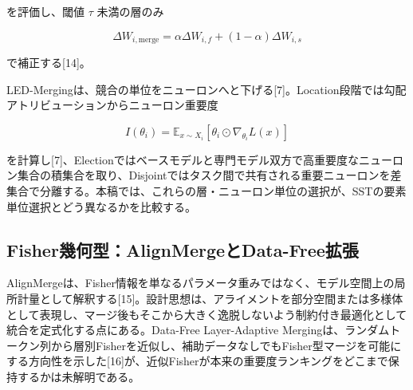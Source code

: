 \documentclass{article}
\begin{document}
を評価し、閾値 \(\tau\) 未満の層のみ

\[
\Delta W_{i,\mathrm{merge}}=\alpha\Delta W_{i,f}+(1-\alpha)\Delta W_{i,s}
\tag{11}
\]

で補正する[14]。

LED-Mergingは、競合の単位をニューロンへと下げる[7]。Location段階では勾配アトリビューションからニューロン重要度

\[
I(\theta_i)=\mathbb{E}_{x\sim X_i}[\theta_i\odot\nabla_{\theta_i}L(x)]
\tag{12}
\]

を計算し[7]、Electionではベースモデルと専門モデル双方で高重要度なニューロン集合の積集合を取り、Disjointではタスク間で共有される重要ニューロンを差集合で分離する。本稿では、これらの層・ニューロン単位の選択が、SSTの要素単位選択とどう異なるかを比較する。

\subsection{Fisher幾何型：AlignMergeとData-Free拡張}

AlignMergeは、Fisher情報を単なるパラメータ重みではなく、モデル空間上の局所計量として解釈する[15]。設計思想は、アライメントを部分空間または多様体として表現し、マージ後もそこから大きく逸脱しないよう制約付き最適化として統合を定式化する点にある。Data-Free Layer-Adaptive Mergingは、ランダムトークン列から層別Fisherを近似し、補助データなしでもFisher型マージを可能にする方向性を示した[16]が、近似Fisherが本来の重要度ランキングをどこまで保持するかは未解明である。
\end{document}
